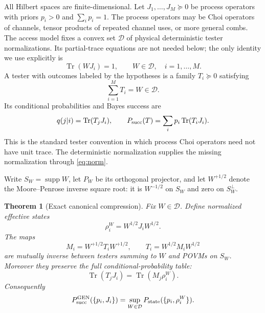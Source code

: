 \documentclass[11pt]{article}
\newtheorem{theorem}{Theorem}[section]
\theoremstyle{definition}
\theoremstyle{remark}
\newcommand{\supp}{\operatorname{supp}}
\newcommand{\Tr}{\operatorname{Tr}}
\newcommand{\cD}{\mathcal D}
\begin{document}
All Hilbert spaces are finite-dimensional.  Let
$J_1,\ldots,J_M\succeq0$ be process operators with priors
$p_i>0$ and $\sum_i p_i=1$.  The process operators may be Choi operators of
channels, tensor products of repeated channel uses, or more general combs.
The access model fixes a convex set $\cD$ of physical deterministic
tester normalizations.  Its partial-trace equations are not needed below; the
only identity we use explicitly is
\begin{equation}
  \Tr(WJ_i)=1,
  \qquad W\in\cD,\quad i=1,\ldots,M.                    \label{eq:norm}
\end{equation}
A tester with outcomes labeled by the hypotheses is a family
$T_i\succeq0$ satisfying
\begin{equation}
                 \sum_{i=1}^M T_i=W\in\cD.             \label{eq:tester}
\end{equation}
Its conditional probabilities and Bayes success are
\begin{equation}
  q(j|i)=\Tr(T_jJ_i),\qquad
  P_{\rm succ}(T)=\sum_i p_i\Tr(T_iJ_i).                \label{eq:success}
\end{equation}
This is the standard tester convention in which process Choi operators need
not have unit trace.  The deterministic normalization supplies the missing
normalization through \cref{eq:norm}.

Write $S_W=\supp W$, let $P_W$ be its orthogonal projector, and let
$W^{+1/2}$ denote the Moore--Penrose inverse square root: it is $W^{-1/2}$ on
$S_W$ and zero on $S_W^\perp$.

\begin{theorem}[Exact canonical compression]\label{thm:compression}
Fix $W\in\cD$.  Define normalized effective states
\begin{equation}
             \rho_i^{W}=W^{1/2}J_iW^{1/2}.              \label{eq:effective}
\end{equation}
The maps
\begin{equation}
  M_i=W^{+1/2}T_iW^{+1/2},\qquad
  T_i=W^{1/2}M_iW^{1/2}                                \label{eq:maps}
\end{equation}
are mutually inverse between testers summing to $W$ and POVMs on $S_W$.
Moreover they preserve the full conditional-probability table:
\begin{equation}
             \Tr(T_jJ_i)=\Tr(M_j\rho_i^W).              \label{eq:preserve}
\end{equation}
Consequently
\begin{equation}
 P_{\rm succ}^{\rm GEN}(\{p_i,J_i\})
 =\sup_{W\in\cD}P_{\rm state}(\{p_i,\rho_i^W\}).       \label{eq:variational}
\end{equation}
\end{theorem}
\end{document}
